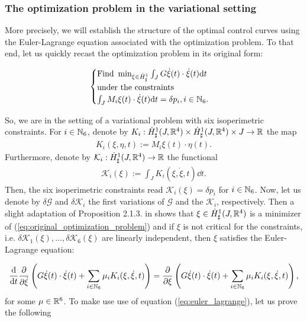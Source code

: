 \subsubsection{The optimization problem in the variational setting}
More precisely, we will establish the structure of the optimal control curves using the Euler-Lagrange equation associated with the optimization problem. To that end, let us quickly recast the optimization problem in its original form:

\begin{align}
\label{eq:original_optimization_problem}
\begin{cases}
 \text{Find } \min_{\xi \in \dot{H}^1_{\sharp}} \int_{J} G \dot{\xi}(t) \cdot \dot{\xi}(t) \mathrm{d}t\\
 \text{under the constraints }\\
 \int_{J} M_i \xi(t) \cdot \dot{\xi}(t) \mathrm{d}t = \delta p_i, i \in \mathbb{N}_6.
 \end{cases}
\end{align}

So, we are in the setting of a variational problem with six isoperimetric constraints. For $i \in \mathbb{N}_6$, denote by $K_i: \dot{H}^{1}_{\sharp}(J, \mathbb{R}^4) \times \dot{H}^{1}_{\sharp}(J, \mathbb{R}^4) \times J \to \mathbb{R}$ the map
\begin{align}
	K_i(\xi, \eta, t) := M_i \xi(t) \cdot \eta(t).
\end{align}
Furthermore, denote by $\mathcal{K}_i : \dot{H}^{1}_{\sharp}(J, \mathbb{R}^4) \to \mathbb{R}$ the functional
\begin{align}
	\mathcal{K}_i(\xi) := \int_{J} K_i(\xi, \dot{\xi}, t) \dd t.
\end{align}
Then, the six isoperimetric constraints read $\mathcal{K}_i(\xi) = \delta p_i$ for $i \in \mathbb{N}_6$. Now, let us denote by $\delta \mathcal{G}$ and $\delta \mathcal{K}_i$ the first variations of $\mathcal{G}$ and the $\mathcal{K}_i$, respectively. Then a slight adaptation of Proposition 2.1.3. in \cite{Kielhoefer2018} shows that $\xi \in \dot{H}^{1}_{\sharp}(J, \mathbb{R}^4)$ is a minimizer of (\ref{eq:original_optimization_problem}) and if $\xi$ is not critical for the constraints, i.e. $\delta \mathcal{K}_1(\xi), \dotsc, \delta \mathcal{K}_6(\xi)$ are linearly independent, then $\xi$ satisfies the Euler-Lagrange equation:

\begin{align}
\label{eq:euler_lagrange}
\frac{\dd}{\dd t} \frac{\partial}{\partial \dot{\xi}} \left ( G \dot{\xi}(t) \cdot \dot{\xi}(t) + \sum_{i \in \N_6} \mu_i K_i(\xi, \dot{\xi}, t)\right ) = \frac{\partial}{\partial \xi} \left ( G \dot{\xi}(t) \cdot \dot{\xi}(t) + \sum_{i \in \N_6} \mu_i K_i(\xi, \dot{\xi}, t)\right ),
\end{align}
for some $\mu \in \mathbb{R}^6$. To make use use of equation (\ref{eq:euler_lagrange}), let us prove the following


